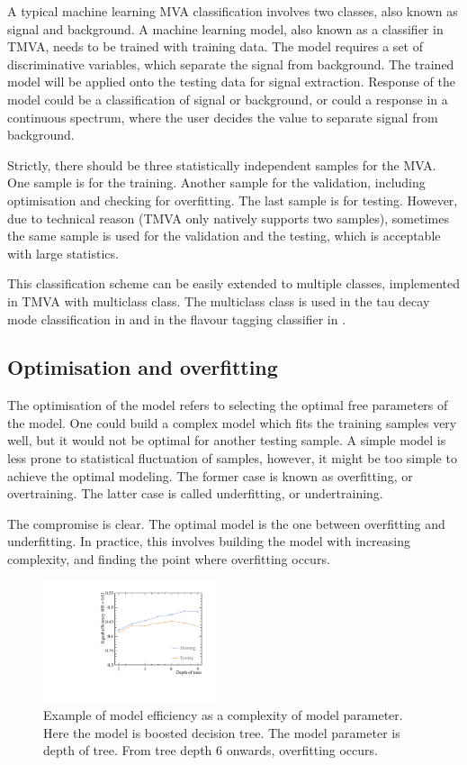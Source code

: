 A typical machine learning MVA classification involves two classes, also known as signal and background. A machine learning model, also known as a classifier in TMVA, needs to be trained with training data. The model requires a set of discriminative variables, which separate the signal from background. The trained model will be applied onto the testing data for signal extraction. Response of the model could be a classification of signal or background, or could  a response in a continuous spectrum, where the user decides the value to separate signal from background.

Strictly, there should be three statistically independent samples for the MVA. One sample is for the training. Another sample for the validation, including optimisation and checking for overfitting. The last sample is for testing. However, due to technical reason (TMVA only natively supports two samples), sometimes the same sample is used for the validation and the testing, which is acceptable with large statistics.

This classification scheme can be easily extended to multiple classes, implemented in TMVA with multiclass class. The multiclass class is used in the tau decay mode classification in \Section{} and in the flavour tagging classifier in .

\subsection{Optimisation and overfitting}
\label{sec:pandoraMVAoptimisation}

The optimisation of the model refers to selecting the optimal free parameters of the model. One could build a complex model which fits the training samples very well, but it would not be optimal for another testing sample. A simple model is less prone to statistical fluctuation of samples, however, it might be too simple to achieve the optimal modeling. The former case is known as overfitting, or overtraining. The latter case is called underfitting, or undertraining.

The compromise is clear. The optimal model is the one between overfitting and underfitting. In practice, this involves building the model with increasing complexity, and finding the point where overfitting occurs.

\begin{figure}[!tbp]
\includegraphics[width=0.45\textwidth]{doubleHiggs/DepthOfTrees.pdf}
\caption{Example of model efficiency as a complexity of model parameter. Here the model is boosted decision tree. The model parameter is depth of tree. From tree depth 6 onwards, overfitting occurs.}
\label{fig:doubleHiggsMVAovertraining}
\end{figure}

